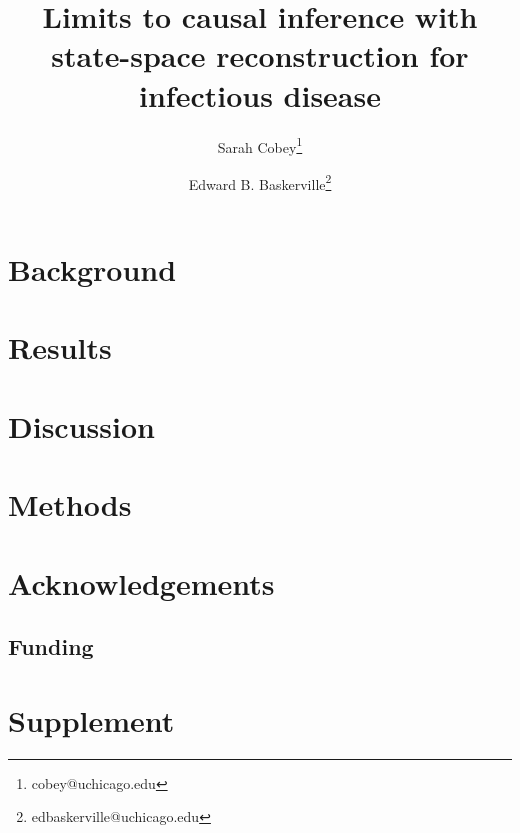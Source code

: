 \documentclass[11pt]{article}
\title{Limits to causal inference with state-space reconstruction for infectious disease}
\author[1]{Sarah Cobey\thanks{cobey@uchicago.edu}}
\author[1]{Edward B. Baskerville\thanks{edbaskerville@uchicago.edu}}
\affil[1]{Ecology \& Evolution, University of Chicago, Chicago, IL, USA}
\date{}
\newcommand{\beginsupplement}{%
        \setcounter{table}{0}
        \renewcommand{\thetable}{S\arabic{table}}%
        \setcounter{figure}{0}
        \renewcommand{\thefigure}{S\arabic{figure}}%
     }
\begin{document}
\maketitle

\begin{abstract}



\end{abstract}

\section*{Background}


  
\section*{Results}



\section*{Discussion}



\section*{Methods}



\section*{Acknowledgements}



\subsection*{Funding}





\beginsupplement

\section*{Supplement}


\end{document}
